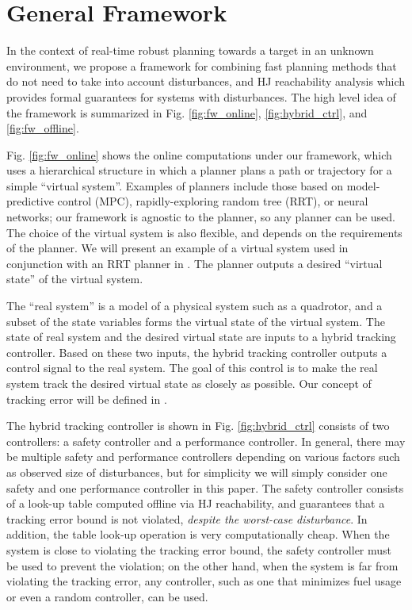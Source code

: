 \section{General Framework \label{sec:framework}}
In the context of real-time robust planning towards a target in an unknown environment, we propose a framework for combining fast planning methods that do not need to take into account disturbances, and HJ reachability analysis which provides formal guarantees for systems with disturbances. The high level idea of the framework is summarized in Fig. \ref{fig:fw_online}, \ref{fig:hybrid_ctrl}, and \ref{fig:fw_offline}.

Fig. \ref{fig:fw_online} shows the online computations under our framework, which uses a hierarchical structure in which a planner plans a path or trajectory for a simple ``virtual system''. Examples of planners include those based on model-predictive control (MPC), rapidly-exploring random tree (RRT), or neural networks; our framework is agnostic to the planner, so any planner can be used. The choice of the virtual system is also flexible, and depends on the requirements of the planner. We will present an example of a virtual system used in conjunction with an RRT planner in . The planner outputs a desired ``virtual state'' of the virtual system.

The ``real system'' is a model of a physical system such as a quadrotor, and a subset of the state variables forms the virtual state of the virtual system. The state of real system and the desired virtual state are inputs to a hybrid tracking controller. Based on these two inputs, the hybrid tracking controller outputs a control signal to the real system. The goal of this control is to make the real system track the desired virtual state as closely as possible. Our concept of tracking error will be defined in .

The hybrid tracking controller is shown in Fig. \ref{fig:hybrid_ctrl} consists of two controllers: a safety controller and a performance controller. In general, there may be multiple safety and performance controllers depending on various factors such as observed size of disturbances, but for simplicity we will simply consider one safety and one performance controller in this paper. The safety controller consists of a look-up table computed offline via HJ reachability, and guarantees that a tracking error bound is not violated, \textit{despite the worst-case disturbance}. In addition, the table look-up operation is very computationally cheap. When the system is close to violating the tracking error bound, the safety controller must be used to prevent the violation; on the other hand, when the system is far from violating the tracking error, any controller, such as one that minimizes fuel usage or even a random controller, can be used.

